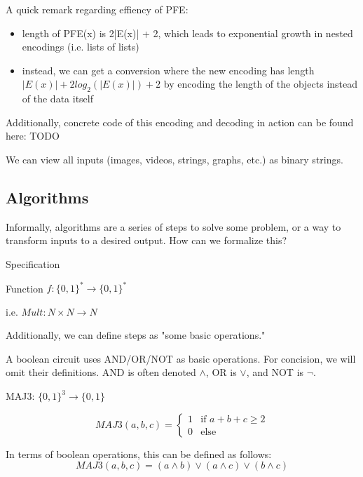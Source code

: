 A quick remark regarding effiency of PFE: 
\begin{itemize}
    \item length of PFE(x) is 2|E(x)| + 2, which leads to exponential growth in nested encodings (i.e. lists of lists)
    \item instead, we can get a conversion where the new encoding has length $|E(x)| + 2log_2(|E(x)|) + 2$ by encoding the length of the objects instead of the data itself
\end{itemize}

Additionally, concrete code of this encoding and decoding in action can be found here: TODO

\vspace{.5cm}

 We can view all inputs (images, videos, strings, graphs, etc.) as binary strings.

\hr

\subsection*{Algorithms}

Informally, algorithms are a series of steps to solve some problem, or a way to transform inputs to a desired output. How can we formalize this?

\begin{definition}
    Specification
    
    Function $f: \{0,1\}^* \rightarrow \{0,1\}^*$
    
    i.e. $Mult: N \times N \rightarrow N$
\end{definition}

Additionally, we can define steps as "some basic operations."

\vspace{.5cm}


A boolean circuit uses AND/OR/NOT as basic operations. For concision, we will omit their definitions. AND is often denoted $\land$, OR is $\lor$, and NOT is $\lnot$.

\begin{example}
    MAJ3: $\{0, 1\}^3 \rightarrow \{0,1\}$

    \begin{equation}
        MAJ3(a, b, c)= 
        \begin{cases}
            1 & \text{if } a + b + c \ge 2 \\
            0 & \text{else}
        \end{cases}
    \end{equation}

    In terms of boolean operations, this can be defined as follows:
    \[
        MAJ3(a,b,c) = (a \land b) \lor (a \land c) \lor (b \land c)
    \]
\end{example}

